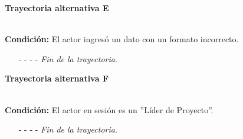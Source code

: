 \hypertarget{CU12-5:TAE}{\textbf{Trayectoria alternativa E}}\\
\noindent \textbf{Condición:} El actor ingresó un dato con un formato incorrecto.
\begin{enumerate}
	\UCpaso[\UCsist] Muestra el mensaje  señalando el campo que presenta el error en la pantalla .
	\UCpaso Regresa al paso \ref{CU12.5-P5} de la Trayectoria principal o al paso \ref{CU12.5-TAP2} de la Trayectoria alternativa B.
	\item[- -] - - {\em {Fin de la trayectoria}}.
\end{enumerate}
\hypertarget{CU12-5:TAF}{\textbf{Trayectoria alternativa F}}\\
\noindent \textbf{Condición:} El actor en sesión es un ''Líder de Proyecto''.
\begin{enumerate}
	\UCpaso[\UCsist] Cambia el estado del caso de uso a ''Liberado''.
	\UCpaso Continúa en el paso \ref{CU12.5-P12} de la Trayectoria principal.
	\item[- -] - - {\em {Fin de la trayectoria}}.
\end{enumerate}